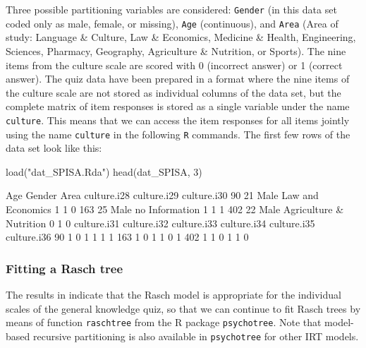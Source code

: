 \documentclass[doc,floatsintext,natbib]{apa7}
\begin{document}
Three possible partitioning variables are considered: \texttt{Gender} (in this data set coded only as male, female, or missing), \texttt{Age} (continuous), and \texttt{Area} (Area of study: Language \& Culture, Law \& Economics, Medicine \& Health, Engineering, Sciences, Pharmacy, Geography, Agriculture \& Nutrition, or Sports). The nine items from the culture scale are scored with 0 (incorrect answer) or 1 (correct answer). 
The quiz data have been prepared in a format where the nine items of the culture scale are not stored as individual columns of the data set, but the complete matrix of item responses is stored as a single variable \citep[see][]{raschtree:vignette} under the name \texttt{culture}. This means that we can access the item responses for all items jointly using the name \texttt{culture} in the following \texttt{R} commands. The first few rows of the data set look like this:

\begin{Schunk}
\begin{Sinput}
 load("dat_SPISA.Rda")
 head(dat_SPISA, 3)
\end{Sinput}
\begin{Soutput}
    Age Gender                    Area culture.i28 culture.i29 culture.i30
90   21   Male       Law and Economics           1           1           0
163  25   Male          no Information           1           1           1
402  22   Male Agriculture & Nutrition           0           1           0
    culture.i31 culture.i32 culture.i33 culture.i34 culture.i35 culture.i36
90            1           0           1           1           1           1
163           1           0           1           1           0           1
402           1           1           0           1           1           0
\end{Soutput}
\end{Schunk}

\subsubsection{Fitting a Rasch tree}

The results in \citet{SPISA:book} indicate that the Rasch model is appropriate for the individual scales of the general knowledge quiz, so that we can continue to fit Rasch trees by means of function \texttt{raschtree} from the R package \texttt{psychotree}. Note that model-based recursive partitioning is also available in \texttt{psychotree} for other IRT models.
\end{document}
